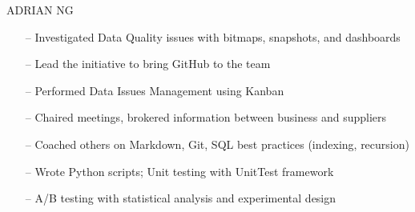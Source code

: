 \documentclass[10pt,a4paper]{altacv}
\begin{document}
\tagline{}

%

\begin{fullwidth}
\namefont\color{name}\MakeUppercase{Adrian Ng}\par
\end{fullwidth}

%





\begin{itemize}
    \setlength{\itemindent}{0.5em}
    \item[--]   \small{Investigated Data Quality issues with bitmaps, snapshots, and dashboards}
    \item[--]   \small{Lead the initiative to bring GitHub to the team}
    \item[--]   \small{Performed Data Issues Management using Kanban}
    \item[--]   \small{Chaired meetings, brokered information between business and suppliers}
    \item[--]   \small{Coached others on Markdown, Git, SQL best practices (indexing, recursion)}
    \item[--]   \small{Wrote Python scripts; Unit testing with UnitTest framework} 
    \item[--]   \small{A/B testing with statistical analysis and experimental design}  
\end{itemize}

\medskip



\end{document}
